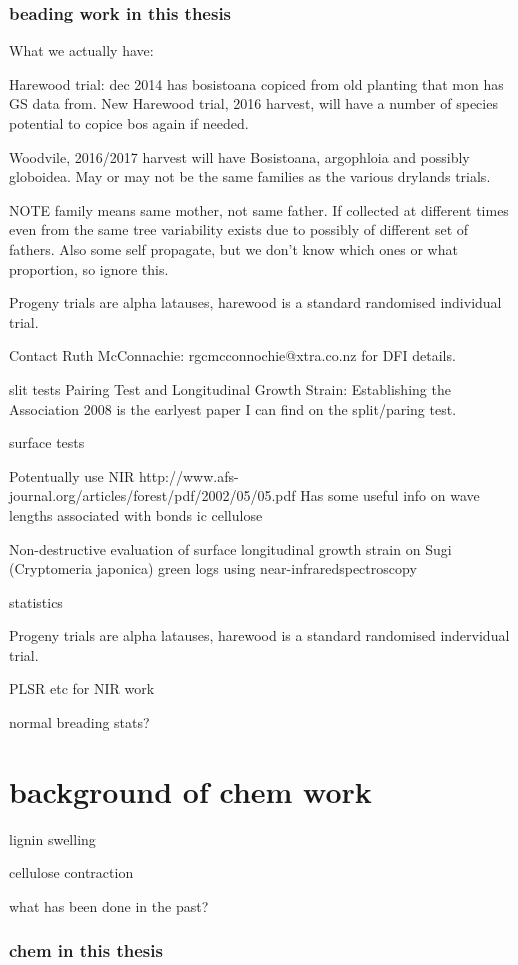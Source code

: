 \documentclass{article}
\begin{document}
\subsubsection{beading work in this thesis}
What we actually have:

Harewood trial:
dec 2014 has bosistoana copiced from old planting that mon has GS data from.
New Harewood trial, 2016 harvest, will have a number of species potential to
copice bos again if needed.

Woodvile, 2016/2017 harvest will have Bosistoana, argophloia and possibly globoidea.
May or may not be the same families as the various drylands trials.

NOTE family means same mother, not same father.
If collected at different times even from the same tree variability exists due
to possibly of different set of fathers. Also some self propagate, but we don't
know which ones or what proportion, so ignore this.

Progeny trials are alpha latauses, harewood is a standard randomised individual
trial.

Contact Ruth McConnachie: rgcmcconnochie@xtra.co.nz for DFI details.

slit tests
Pairing Test and Longitudinal Growth Strain: Establishing the Association 2008
is the earlyest paper I can find on the split/paring test.

surface tests

Potentually use NIR
http://www.afs-journal.org/articles/forest/pdf/2002/05/05.pdf
Has some useful info on wave lengths associated with bonds ic cellulose

Non-destructive evaluation of surface longitudinal growth strain
on Sugi (Cryptomeria japonica) green logs using near-infraredspectroscopy

statistics

Progeny trials are alpha latauses, harewood is a standard randomised indervidual
trial.

PLSR etc for NIR work

normal breading stats?

\section{background of chem work}

lignin swelling

cellulose contraction

what has been done in the past?


\subsubsection{chem in this thesis}
\end{document}
